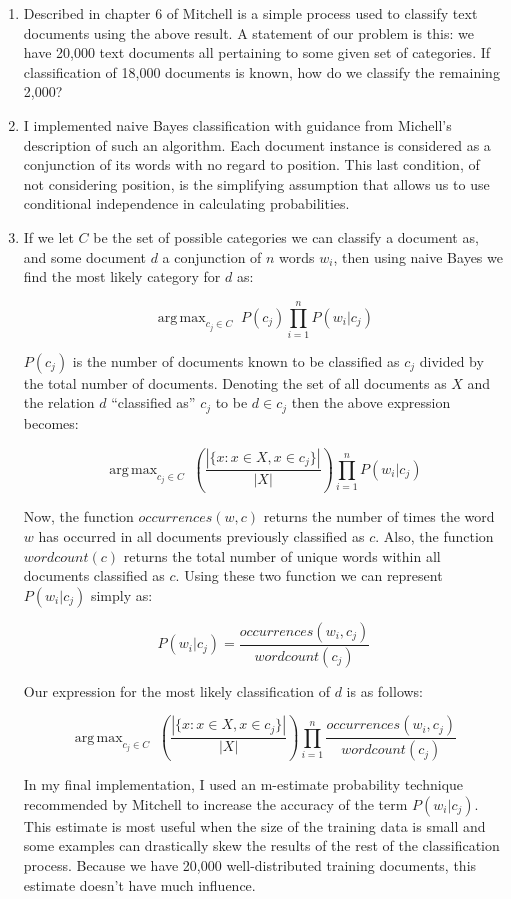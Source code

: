 \documentclass[a4paper,12pt]{article}
\DeclareMathOperator*{\argmax}{arg\,max}
\begin{document}
\begin{enumerate}[]
  \item Described in chapter 6 of Mitchell is a simple process used to
    classify text documents using the above result. A statement of our
    problem is this: we have 20,000 text documents all pertaining to
    some given set of categories. If classification of 18,000
    documents is known, how do we classify the remaining 2,000?

  \item I implemented naive Bayes classification with guidance from
    Michell's description of such an algorithm. Each document instance
    is considered as a conjunction of its words with no regard to
    position. This last condition, of not considering position, is the
    simplifying assumption that allows us to use conditional
    independence in calculating probabilities. 
    
  \item If we let $C$ be the set of possible categories we can
    classify a document as, and some document $d$ a conjunction of $n$
    words $w_i$, then using naive Bayes we find the most likely
    category for $d$ as:
    
    \[\argmax_{c_j \in C} \; P(c_j)\prod_{i=1}^nP(w_i|c_j)\]

    $P(c_j)$ is the number of documents known to be classified as
    $c_j$ divided by the total number of documents. Denoting the set
    of all documents as $X$ and the relation $d$ ``classified as''
    $c_j$ to be $d \in c_j$ then the above expression becomes:

    \[
    \argmax_{c_j \in C} \; \left(\dfrac{|\{x : x \in X, x \in c_j\}|}{|X|}\right)
    \prod_{i=1}^nP(w_i|c_j)
    \]

    Now, the function $occurrences(w, c)$ returns the number of times
    the word $w$ has occurred in all documents previously classified
    as $c$. Also, the function $wordcount(c)$ returns the total number
    of unique words within all documents classified as $c$. Using
    these two function we can represent $P(w_i|c_j)$ simply as: 
    
    \[P(w_i|c_j) = \dfrac{occurrences(w_i, c_j)}{wordcount(c_j)}\]

    
    Our expression for the most likely classification of $d$ is as
    follows:

    \[
    \argmax_{c_j \in C} \; \left(\dfrac{|\{x : x \in X, x \in c_j\}|}{|X|}\right)
    \prod_{i=1}^n\dfrac{occurrences(w_i, c_j)}{wordcount(c_j)}
    \]

    In my final implementation, I used an m-estimate probability
    technique recommended by Mitchell to increase the accuracy of the
    term $P(w_i|c_j)$. This estimate is most useful when the size of
    the training data is small and some examples can drastically skew
    the results of the rest of the classification process. Because we
    have 20,000 well-distributed training documents, this estimate
    doesn't have much influence.
    
\end{enumerate}
\end{document}
